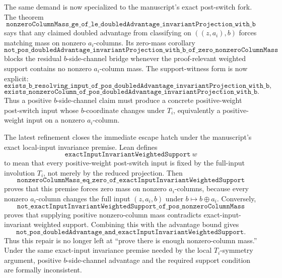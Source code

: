 \documentclass[11pt]{article}
\theoremstyle{remark}
\begin{document}
The same demand is now specialized to the manuscript's exact post-switch fork.  The theorem
\[
  \texttt{nonzeroColumnMass\_ge\_of\_le\_doubledAdvantage\_invariantProjection\_with\_b}
\]
says that any claimed doubled advantage from classifying on \(((z,a_i),b)\) forces matching mass on
nonzero \(a_i\)-columns.  Its zero-mass corollary
\[
  \texttt{not\_pos\_doubledAdvantage\_invariantProjection\_with\_b\_of\_zero\_nonzeroColumnMass}
\]
blocks the residual \(b\)-side-channel bridge whenever the proof-relevant weighted support contains
no nonzero \(a_i\)-column mass.
The support-witness form is now explicit:
\[
  \texttt{exists\_b\_resolving\_input\_of\_pos\_doubledAdvantage\_invariantProjection\_with\_b},
\]
\[
  \texttt{exists\_nonzeroColumn\_of\_pos\_doubledAdvantage\_invariantProjection\_with\_b}.
\]
Thus a positive \(b\)-side-channel claim must produce a concrete positive-weight post-switch input
whose \(b\)-coordinate changes under \(T_i\), equivalently a positive-weight input on a nonzero
\(a_i\)-column.

The latest refinement closes the immediate escape hatch under the manuscript's exact local-input
invariance premise.  Lean defines
\[
  \texttt{exactInputInvariantWeightedSupport}\ w
\]
to mean that every positive-weight post-switch input is fixed by the full-input involution
\(T_i\), not merely by the reduced projection.  Then
\[
  \texttt{nonzeroColumnMass\_eq\_zero\_of\_exactInputInvariantWeightedSupport}
\]
proves that this premise forces zero mass on nonzero \(a_i\)-columns, because every nonzero
\(a_i\)-column changes the full input \((z,a_i,b)\) under \(b \mapsto b \oplus a_i\).  Conversely,
\[
  \texttt{not\_exactInputInvariantWeightedSupport\_of\_pos\_nonzeroColumnMass}
\]
proves that supplying positive nonzero-column mass contradicts exact-input-invariant weighted
support.  Combining this with the advantage bound gives
\[
  \texttt{not\_pos\_doubledAdvantage\_and\_exactInputInvariantWeightedSupport}.
\]
Thus this repair is no longer left at ``prove there is enough nonzero-column mass.''  Under the
same exact-input invariance premise needed by the local \(T_i\)-symmetry argument, positive
\(b\)-side-channel advantage and the required support condition are formally inconsistent.
\end{document}
